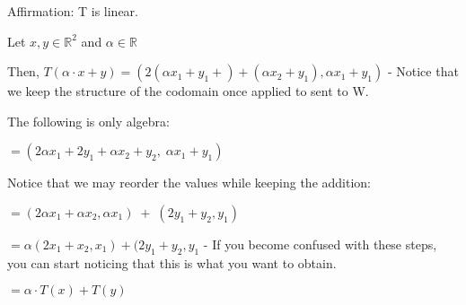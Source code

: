 \documentclass{article}
\begin{document}
Affirmation: T is linear.

Let \(x,y \in \mathbb{R}^{2}\) and \(\alpha \in \mathbb{R}\)

Then, \(T(\alpha \cdot x +y) = (2(\alpha x_1 + y_1 + ) + (\alpha x_2 + y_1), \alpha x_1 + y_1)\) - Notice that we keep the structure of the codomain once applied to sent to W.

The following is only algebra:

\(=(2\alpha x_1 + 2y_1 + \alpha x_2 + y_2,\;\alpha x_1 + y_1)\)

Notice that we may reorder the values while keeping the addition:

\(=(2\alpha x_1 + \alpha x_2, \alpha x_1)\;+\;(2y_1 + y_2, y_1)\)

\(=\alpha (2x_1 + x_2, x_1) + (2y_1 + y_2, y_1\) - If you become confused with these steps, you can start noticing that this is what you want to obtain.  

\(=\alpha \cdot T(x) + T(y)\)
\end{document}
